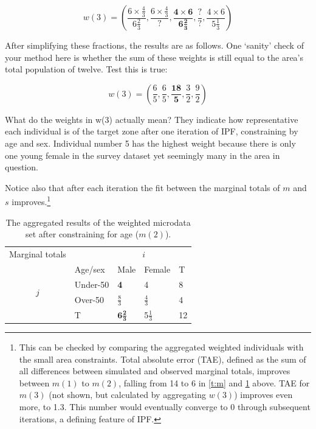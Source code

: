 \documentclass[a4paper, 11pt, twoside]{article}
\begin{document}
\begin{equation}
w(3) = (\frac{6 \times \frac{4}{3}}{6 \frac{2}{3}}, \frac{6 \times
\frac{4}{3}}{?}, \boldsymbol{ \frac{4 \times 6}{ 6\frac{2}{3}
}}, \frac{?}{?}, \frac{4 \times 6}{5 \frac{1}{3}})
\end{equation}

After simplifying these fractions, the results are as follows.
One `sanity' check of your method here is whether the sum of these
weights is still equal to the area's total population of twelve. Test this is
true:

\begin{equation}
w(3) = (\frac{6}{5}, \frac{6}{5}, \boldsymbol{\frac{18}{5}}, \frac{3}{2},
\frac{9}{2})
\label{finalout}
\end{equation}

What do the weights in w(3) actually mean? They indicate how representative
each individual is of the target zone after one iteration of IPF, constraining
by age and sex. Individual number 5 has the highest weight because there is
only one young female in the survey dataset yet seemingly many in the area in
question.

Notice also that after each iteration the fit between the marginal
totals of $m$ and $s$
improves.\footnote{This can be checked by comparing the aggregated weighted
individuals with the small area constraints. Total absolute error (TAE),
defined as the sum of all differences between simulated and observed marginal
totals, improves between $m(1)$ to $m(2)$, falling from
14 to 6 in \cref{t:m} and \cref{t:m2} above. TAE for $m(3)$ (not shown,
but calculated by aggregating $w(3)$) improves even more, to 1.3.
This number would eventually converge to 0 through subsequent
iterations, a defining feature of IPF.}


\begin{table}[htbp]
\centering
\caption[Aggregated results after constraining for age]{The
aggregated results of the weighted
microdata set after constraining for age ($m(2)$).
}

\begin{tabular}{cllll}\toprule
Marginal totals&  & \multicolumn{2}{c}{$i$} & \\
& Age/sex & Male & Female & T\\ \midrule
\multirow{2}{*}{$j$} & Under-50 & \textbf{4} & 4 & 8\\
& Over-50 & $\frac{8}{3}$ & $\frac{4}{3}$ & 4 \\
& T & $\boldsymbol{6\frac{2}{3}}$ & 5$\frac{1}{3}$ & 12\\
\bottomrule
\end{tabular}
\label{t:m2}
\end{table}
\end{document}
